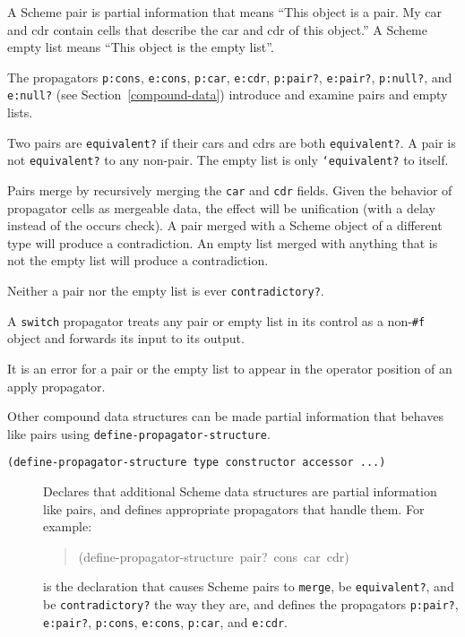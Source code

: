 \documentclass[12pt,letterpaper,english]{article}
\begin{document}
A Scheme pair is partial information that means ``This object is a
pair.  My car and cdr contain cells that describe the car and cdr of
this object.''  A Scheme empty list means ``This object is the empty
list''.

The propagators \texttt{p:cons}, \texttt{e:cons}, \texttt{p:car}, \texttt{e:cdr},
\texttt{p:pair?}, \texttt{e:pair?}, \texttt{p:null?}, and \texttt{e:null?}
(see Section~\ref{compound-data})
introduce and examine pairs and empty lists.

Two pairs are \texttt{equivalent?} if their cars and cdrs are both
\texttt{equivalent?}.  A pair is not \texttt{equivalent?} to any non-pair.  The
empty list is only \texttt{`equivalent?} to itself.

Pairs merge by recursively merging the \texttt{car} and \texttt{cdr} fields.
Given the behavior of propagator cells as mergeable data, the effect
will be unification (with a delay instead of the occurs check).  A
pair merged with a Scheme object of a different type will produce a
contradiction.  An empty list merged with anything that is not the
empty list will produce a contradiction.

Neither a pair nor the empty list is ever \texttt{contradictory?}.

A \texttt{switch} propagator treats any pair or empty list in its control
as a non-\texttt{{\#}f} object and forwards its input to its output.

It is an error for a pair or the empty list to appear in the operator
position of an apply propagator.

Other compound data structures can be made partial information that
behaves like pairs using \texttt{define-propagator-structure}.
\begin{description}
\item[{\texttt{(define-propagator-structure type constructor accessor ...)}}] \leavevmode 
Declares that additional Scheme data structures are partial
information like pairs, and defines appropriate propagators
that handle them.  For example:
\begin{quote}{\ttfamily \raggedright \noindent
(define-propagator-structure~pair?~cons~car~cdr)
}\end{quote}
is the declaration that causes Scheme pairs to \texttt{merge}, be
\texttt{equivalent?}, and be \texttt{contradictory?} the way they are, and
defines the propagators \texttt{p:pair?}, \texttt{e:pair?}, \texttt{p:cons},
\texttt{e:cons}, \texttt{p:car}, and \texttt{e:cdr}.

\end{description}
\end{document}
